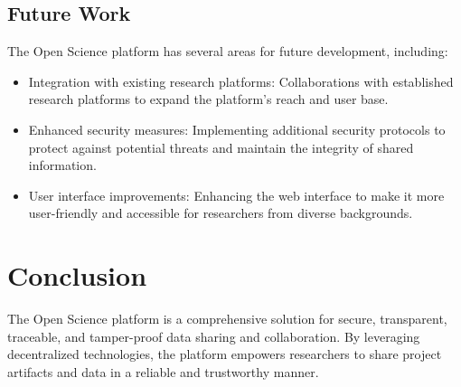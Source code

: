 \documentclass{article}
\begin{document}
\subsection{Future Work}

The Open Science platform has several areas for future development, including:

\begin{itemize}
    \item Integration with existing research platforms: Collaborations with established research platforms to expand the platform's reach and user base.
    \item Enhanced security measures: Implementing additional security protocols to protect against potential threats and maintain the integrity of shared information.
    \item User interface improvements: Enhancing the web interface to make it more user-friendly and accessible for researchers from diverse backgrounds.
\end{itemize}

\section{Conclusion}
The Open Science platform is a comprehensive solution for secure, transparent, traceable, and tamper-proof data sharing and collaboration. By leveraging decentralized technologies, the platform empowers researchers to share project artifacts and data in a reliable and trustworthy manner.
\end{document}
